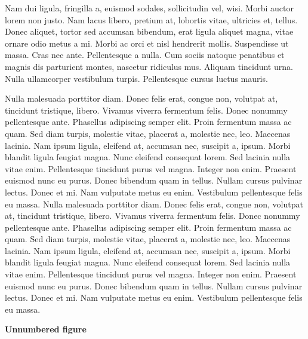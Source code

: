 \documentclass[AMA,Times1COL]{WileyNJDv5} %
\begin{document}

Nam dui ligula, fringilla a, euismod sodales, sollicitudin vel, wisi. Morbi auctor lorem non justo. Nam lacus libero,
pretium at, lobortis vitae, ultricies et, tellus. Donec aliquet, tortor sed accumsan bibendum, erat ligula aliquet magna,
vitae ornare odio metus a mi. Morbi ac orci et nisl hendrerit mollis. Suspendisse ut massa. Cras nec ante. Pellentesque
a nulla. Cum sociis natoque penatibus et magnis dis parturient montes, nascetur ridiculus mus. Aliquam tincidunt
urna. Nulla ullamcorper vestibulum turpis. Pellentesque cursus luctus mauris.

Nulla malesuada porttitor diam. Donec felis erat, congue non, volutpat at, tincidunt tristique, libero. Vivamus
viverra fermentum felis. Donec nonummy pellentesque ante. Phasellus adipiscing semper elit. Proin fermentum massa
ac quam. Sed diam turpis, molestie vitae, placerat a, molestie nec, leo. Maecenas lacinia. Nam ipsum ligula, eleifend
at, accumsan nec, suscipit a, ipsum. Morbi blandit ligula feugiat magna. Nunc eleifend consequat lorem. Sed lacinia
nulla vitae enim. Pellentesque tincidunt purus vel magna. Integer non enim. Praesent euismod nunc eu purus. Donec
bibendum quam in tellus. Nullam cursus pulvinar lectus. Donec et mi. Nam vulputate metus eu enim. Vestibulum
pellentesque felis eu massa.
Nulla malesuada porttitor diam. Donec felis erat, congue non, volutpat at, tincidunt tristique, libero. Vivamus
viverra fermentum felis. Donec nonummy pellentesque ante. Phasellus adipiscing semper elit. Proin fermentum massa
ac quam. Sed diam turpis, molestie vitae, placerat a, molestie nec, leo. Maecenas lacinia. Nam ipsum ligula, eleifend
at, accumsan nec, suscipit a, ipsum. Morbi blandit ligula feugiat magna. Nunc eleifend consequat lorem. Sed lacinia
nulla vitae enim. Pellentesque tincidunt purus vel magna. Integer non enim. Praesent euismod nunc eu purus. Donec
bibendum quam in tellus. Nullam cursus pulvinar lectus. Donec et mi. Nam vulputate metus eu enim. Vestibulum
pellentesque felis eu massa.


\noindent\textbf{Unnumbered figure}
\end{document}
